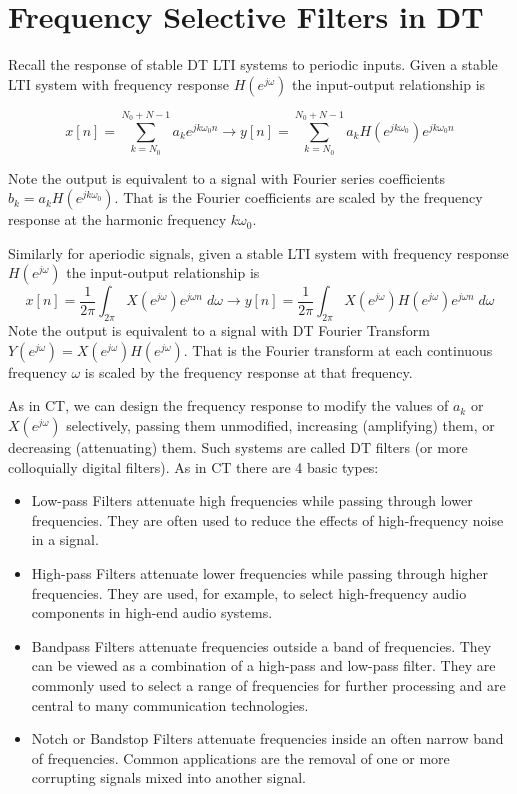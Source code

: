 \section{Frequency Selective Filters in DT}

Recall the response of stable DT LTI systems to periodic inputs. Given a stable LTI system with frequency response $H\left(e^{j\omega}\right)$ the input-output relationship is

\[
x[n] = \sum\limits_{k = N_0}^{N_0 + N-1} a_k e^{jk\omega_0n} \longrightarrow y[n] = \sum\limits_{k = N_0}^{N_0 + N-1} a_k H\left(e^{jk\omega_0}\right) e^{jk\omega_0n} 
\]

Note the output is equivalent to a signal with Fourier series coefficients $b_k = a_k H\left(e^{jk\omega_0}\right)$. That is the Fourier coefficients are scaled by the frequency response at the harmonic frequency $k\omega_0$.

Similarly for aperiodic signals, given a stable LTI system with frequency response $H\left(e^{j\omega}\right)$ the input-output relationship is
\[
x[n] = \frac{1}{2\pi} \int_{2\pi} X\left(e^{j\omega}\right) e^{j\omega n} \; d\omega \longrightarrow y[n] = \frac{1}{2\pi} \int_{2\pi} X\left(e^{j\omega}\right)H\left(e^{j\omega}\right) e^{j\omega n} \; d\omega
\]
Note the output is equivalent to a signal with DT Fourier Transform $Y\left(e^{j\omega}\right) = X\left(e^{j\omega}\right) H\left(e^{j\omega}\right)$. That is the Fourier transform at each continuous frequency $\omega$ is scaled by the frequency response at that frequency. 

As in CT, we can design the frequency response to modify the values of $a_k$ or $X\left(e^{j\omega}\right)$ selectively, passing them unmodified, increasing (amplifying) them, or decreasing (attenuating) them. Such systems are called DT filters (or more colloquially digital filters). As in CT there are 4 basic types:
\begin{itemize}
\item Low-pass Filters attenuate high frequencies while passing through lower frequencies. They are often used to reduce the effects of high-frequency noise in a signal.
\item High-pass Filters attenuate lower frequencies while passing through higher frequencies. They are used, for example, to select high-frequency audio components in high-end audio systems.
\item Bandpass Filters attenuate frequencies outside a band of frequencies. They can be viewed as a combination of a high-pass and low-pass filter. They are commonly used to select a range of frequencies for further processing and are central to many communication technologies. 
\item Notch or Bandstop Filters attenuate frequencies inside an often narrow band of frequencies. Common applications are the removal of one or more corrupting signals mixed into another signal.
\end{itemize}

